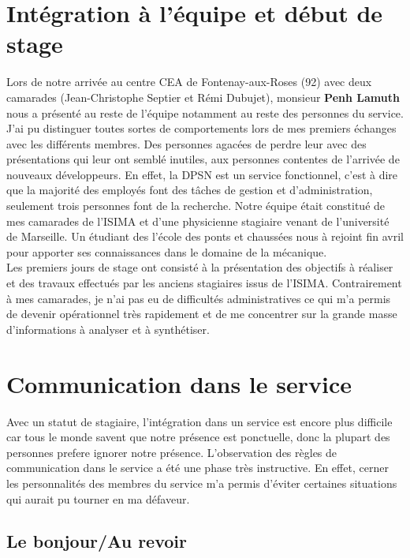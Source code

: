 \documentclass[a4paper,11pt]{article}
\begin{document}
\section{Intégration à l'équipe et début de stage}

\normalsize{
Lors de notre arrivée au centre CEA de Fontenay-aux-Roses (92) avec deux camarades (Jean-Christophe Septier et Rémi Dubujet), monsieur {\bf Penh Lamuth} nous a présenté au reste de l'équipe notamment au reste des personnes du service. J'ai pu distinguer toutes sortes de comportements lors de mes premiers échanges avec les différents membres. Des personnes agacées de perdre leur avec des présentations qui leur ont semblé inutiles, aux personnes contentes de l'arrivée de nouveaux développeurs. En effet, la DPSN est un service fonctionnel, c'est à dire que la majorité des employés font des tâches de gestion et d'administration, seulement trois personnes font de la recherche. Notre équipe était constitué de mes camarades de l'ISIMA et d'une physicienne stagiaire venant de l'université de Marseille. Un étudiant des l'école des ponts et chaussées nous à rejoint fin avril pour apporter ses connaissances dans le domaine de la mécanique.\\

Les premiers jours de stage ont consisté à la présentation des objectifs à réaliser et des travaux effectués par les anciens stagiaires issus de l'ISIMA. Contrairement à mes camarades, je n'ai pas eu de difficultés administratives ce qui m'a permis de devenir opérationnel très rapidement et de me concentrer sur la grande masse d'informations à analyser et à synthétiser.\\
}

\section{Communication dans le service}

\normalsize{
Avec un statut de stagiaire, l'intégration dans un service est encore plus difficile car tous le monde savent que notre présence est ponctuelle, donc la plupart des personnes prefere ignorer notre présence.
L'observation des règles de communication dans le service a été une phase très instructive. En effet, cerner les personnalités des membres du service m'a permis d'éviter certaines situations qui aurait pu tourner en ma défaveur.
}

\subsection{Le bonjour/Au revoir}
\end{document}
